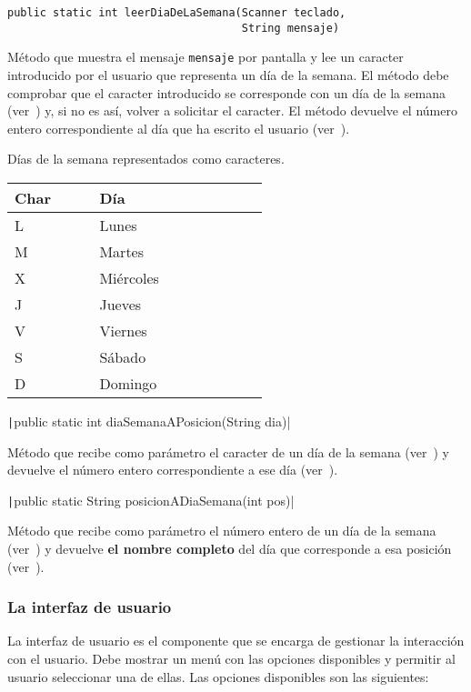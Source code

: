 \documentclass[
    a4paper, %
    12pt, %
]{CSSullivanBusinessReport}
\begin{document}
\begin{verbatim}
public static int leerDiaDeLaSemana(Scanner teclado,
                                    String mensaje)
\end{verbatim}

Método que muestra el mensaje \texttt{mensaje} por pantalla y lee un caracter introducido por el usuario que representa un día de la semana. El método debe comprobar que el caracter introducido se corresponde con un día de la semana (ver~) y, si no es así, volver a solicitar el caracter. El método devuelve el número entero correspondiente al día que ha escrito el usuario (ver~).

\begin{margintable}
    \footnotesize
    \caption{Días de la semana representados como caracteres.}\label{tab:char-semana}
    \begin{tabular}{C{0.2\linewidth} L{0.4\linewidth}}
        \toprule
        \textbf{Char} & \textbf{Día}\\
        \midrule
        L & Lunes\\
        M & Martes\\
        X & Miércoles\\
        J & Jueves\\
        V & Viernes\\
        S & Sábado\\
        D & Domingo\\
        \bottomrule
    \end{tabular}
\end{margintable}

\texttt|public static int diaSemanaAPosicion(String dia)|

Método que recibe como parámetro el caracter de un día de la semana (ver~) y devuelve el número entero correspondiente a ese día (ver~).

\texttt|public static String posicionADiaSemana(int pos)|

Método que recibe como parámetro el número entero de un día de la semana (ver~) y devuelve \textbf{el nombre completo} del día que corresponde a esa posición (ver~).

\subsubsection{La interfaz de usuario}\label{sec:interfaz-usuario}
La interfaz de usuario es el componente que se encarga de gestionar la interacción con el usuario. Debe mostrar un menú con las opciones disponibles y permitir al usuario seleccionar una de ellas. Las opciones disponibles son las siguientes:
\end{document}
